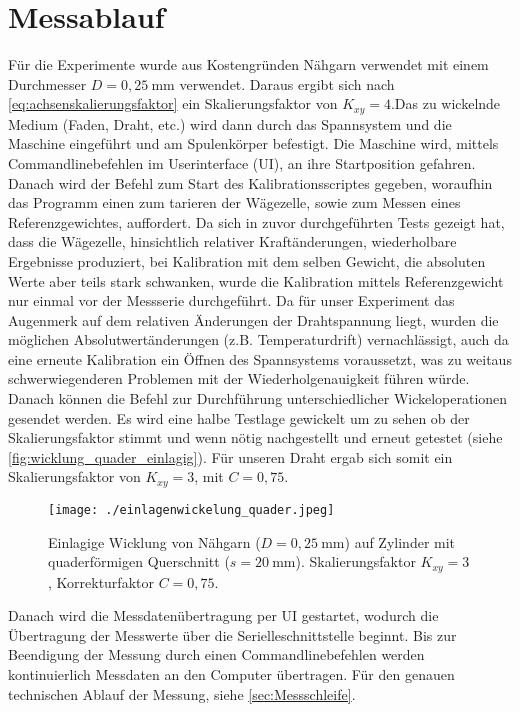 \section{Messablauf}
\label{sec:Messablauf}


Für die Experimente wurde aus Kostengründen Nähgarn verwendet mit einem Durchmesser $D = 0,25~\si{\milli\metre}$ verwendet. Daraus ergibt sich nach \autoref{eq:achsenskalierungsfaktor} ein Skalierungsfaktor von $K_{xy} = 4$.Das zu wickelnde Medium (Faden, Draht, etc.) wird dann durch das Spannsystem und die Maschine eingeführt und am Spulenkörper befestigt. Die Maschine wird, mittels Commandlinebefehlen im Userinterface (UI), an ihre Startposition gefahren. Danach wird der Befehl zum Start des Kalibrationsscriptes gegeben, woraufhin das Programm einen zum tarieren der Wägezelle, sowie zum Messen eines Referenzgewichtes, auffordert. Da sich in zuvor durchgeführten Tests gezeigt hat, dass die Wägezelle, hinsichtlich relativer Kraftänderungen, wiederholbare Ergebnisse produziert, bei Kalibration mit dem selben Gewicht, die absoluten Werte aber teils stark schwanken, wurde die Kalibration mittels Referenzgewicht nur einmal vor der Messserie durchgeführt. Da für unser Experiment das Augenmerk auf dem relativen Änderungen der Drahtspannung liegt, wurden die möglichen Absolutwertänderungen (z.B. Temperaturdrift) vernachlässigt, auch da eine erneute Kalibration ein Öffnen des Spannsystems voraussetzt, was zu weitaus schwerwiegenderen Problemen mit der Wiederholgenauigkeit führen würde.
Danach können die Befehl zur Durchführung unterschiedlicher Wickeloperationen gesendet werden. Es wird eine halbe Testlage gewickelt um zu sehen ob der Skalierungsfaktor stimmt und wenn nötig nachgestellt und erneut getestet (siehe \autoref{fig:wicklung_quader_einlagig}). Für unseren Draht ergab sich somit ein Skalierungsfaktor von $K_{xy} = 3$, mit $C = 0,75$. 
\begin{figure}[H]
    \centering
    \texttt{[image: ./einlagenwickelung\_quader.jpeg]}
    \caption{Einlagige Wicklung von Nähgarn ($D = 0,25~\si{\milli\metre}$) auf Zylinder mit quaderförmigen Querschnitt ($s=20~\si{\milli\metre}$). Skalierungsfaktor $K_{xy} = 3$, Korrekturfaktor $C = 0,75$.}
    \label{fig:wicklung_quader_einlagig}
\end{figure}
Danach wird die  Messdatenübertragung per UI gestartet, wodurch die Übertragung der Messwerte über die Serielleschnittstelle beginnt. Bis zur Beendigung der Messung durch einen Commandlinebefehlen werden kontinuierlich Messdaten an den Computer übertragen. Für den genauen technischen Ablauf der Messung, siehe \autoref{sec:Messschleife}. 



